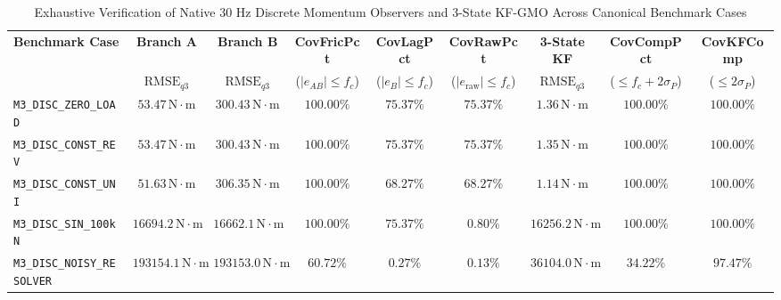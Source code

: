 \documentclass[journal]{IEEEtran}
\begin{document}
\begin{table}[t]
\caption{Exhaustive Verification of Native 30 Hz Discrete Momentum Observers and 3-State KF-GMO Across Canonical Benchmark Cases}
\label{tab:m3_benchmark}
\centering
\begin{tabular}{lcccccccc}
\toprule
\textbf{Benchmark Case} & \textbf{Branch A} & \textbf{Branch B} & \textbf{CovFricPct} & \textbf{CovLagPct} & \textbf{CovRawPct} & \textbf{3-State KF} & \textbf{CovCompPct} & \textbf{CovKFComp} \\
& $\mathrm{RMSE}_{q3}$ & $\mathrm{RMSE}_{q3}$ & ($|e_{AB}| \le f_c$) & ($|e_B| \le f_c$) & ($|e_{\mathrm{raw}}| \le f_c$) & $\mathrm{RMSE}_{q3}$ & ($\le f_c + 2\sigma_P$) & ($\le 2\sigma_P$) \\
\midrule
\texttt{M3\_DISC\_ZERO\_LOAD} & $53.47\,\mathrm{N\cdot m}$ & $300.43\,\mathrm{N\cdot m}$ & $100.00\%$ & $75.37\%$ & $75.37\%$ & $\mathbf{1.36\,\mathrm{N\cdot m}}$ & $100.00\%$ & $100.00\%$ \\
\texttt{M3\_DISC\_CONST\_REV} & $53.47\,\mathrm{N\cdot m}$ & $300.43\,\mathrm{N\cdot m}$ & $100.00\%$ & $75.37\%$ & $75.37\%$ & $\mathbf{1.35\,\mathrm{N\cdot m}}$ & $100.00\%$ & $100.00\%$ \\
\texttt{M3\_DISC\_CONST\_UNI} & $51.63\,\mathrm{N\cdot m}$ & $306.35\,\mathrm{N\cdot m}$ & $100.00\%$ & $68.27\%$ & $68.27\%$ & $\mathbf{1.14\,\mathrm{N\cdot m}}$ & $100.00\%$ & $100.00\%$ \\
\texttt{M3\_DISC\_SIN\_100kN} & $16694.2\,\mathrm{N\cdot m}$ & $16662.1\,\mathrm{N\cdot m}$ & $100.00\%$ & $75.37\%$ & $0.80\%$ & $\mathbf{16256.2\,\mathrm{N\cdot m}}$ & $100.00\%$ & $100.00\%$ \\
\texttt{M3\_DISC\_NOISY\_RESOLVER} & $193154.1\,\mathrm{N\cdot m}$ & $193153.0\,\mathrm{N\cdot m}$ & $60.72\%$ & $0.27\%$ & $0.13\%$ & $\mathbf{36104.0\,\mathrm{N\cdot m}}$ & $34.22\%$ & $\mathbf{97.47\%}$ \\
\bottomrule
\end{tabular}
\end{table}
\end{document}
